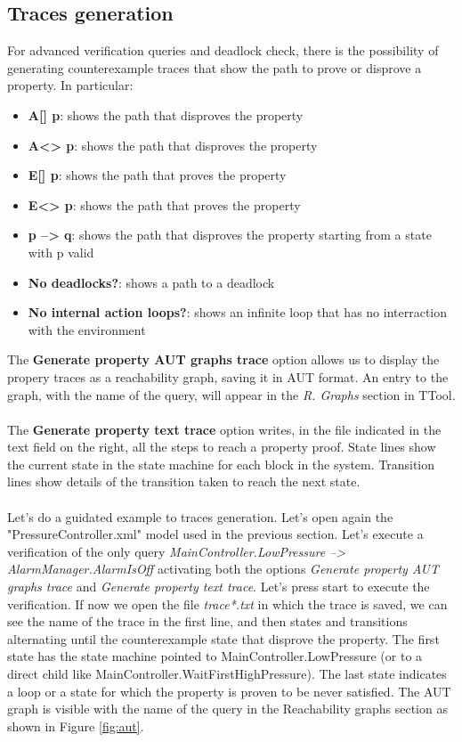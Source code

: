 \documentclass[12pt]{article}
\begin{document}
\subsection{Traces generation} \label{sec:tg}
For advanced verification queries and deadlock check, there is the possibility of generating counterexample traces that show the path to prove or disprove a property. In particular:
\begin{itemize}
\item \textbf{A[] p}: shows the path that disproves the property
\item \textbf{A<> p}: shows the path that disproves the property
\item \textbf{E[] p}: shows the path that proves the property
\item \textbf{E<> p}: shows the path that proves the property
\item \textbf{p --> q}: shows the path that disproves the property starting from a state with p valid
\item \textbf{No deadlocks?}: shows a path to a deadlock
\item \textbf{No internal action loops?}: shows an infinite loop that has no interraction with the environment
\end{itemize}
The \textbf{Generate property AUT graphs trace} option allows us to display the propery traces as a reachability graph, saving it in AUT format. An entry to the graph, with the name of the query, will appear in the \textit{R. Graphs} section in TTool.
\\\\
The \textbf{Generate property text trace} option writes, in the file indicated in the text field on the right, all the steps to reach a property proof. State lines show the current state in the state machine for each block in the system. Transition lines show details of the transition taken to reach the next state.
\\\\
Let's do a guidated example to traces generation. Let's open again the "PressureController.xml" model used in the previous section. Let's execute a verification of the only query \textit{MainController.LowPressure --> AlarmManager.AlarmIsOff} activating both the options \textit{Generate property AUT graphs trace} and \textit{Generate property text trace}. Let's press start to execute the verification. If now we open the file \textit{trace*.txt} in which the trace is saved, we can see the name of the trace in the first line, and then states and transitions alternating until the counterexample state that disprove the property. The first state has the state machine pointed to MainController.LowPressure (or to a direct child like MainController.WaitFirstHighPressure). The last state indicates a loop or a state for which the property is proven to be never satisfied. The AUT graph is visible with the name of the query in the Reachability graphs section as shown in Figure \ref{fig:aut}.
\end{document}
